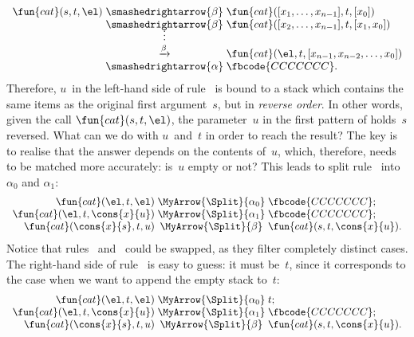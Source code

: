 \begin{equation*}
\begin{array}{r@{\;}c@{\;}l}
\fun{cat}(s,t,\el) & \smashedrightarrow{\beta} &
  \fun{cat}([x\sb{1},\ldots,x\sb{n-1}],t,[x\sb{0}])\\
              & \smashedrightarrow{\beta} &
  \fun{cat}([x\sb{2},\ldots,x\sb{n-1}],t,[x\sb{1},x\sb{0}])\\
              & \smash{\vdots}\\
              & \xrightarrow{\beta} & \fun{cat}(\el,t,[x\sb{n-1},x\sb{n-2},\ldots,x\sb{0}])\\
              & \smashedrightarrow{\alpha} & \fbcode{CCCCCCC}.
\end{array}
\end{equation*}
Therefore, \(u\)~in the left\hyp{}hand side of rule~\clause{\alpha} is
bound to a stack which contains the same items as the original first
argument~\(s\), but in \emph{reverse order}. In other words, given the
call \(\fun{cat}(s,t,\el)\), the parameter~\(u\) in the first pattern
of  holds~\(s\) reversed. What can we do with
\(u\)~and~\(t\) in order to reach the result?  The key is to realise
that the answer depends on the contents of~\(u\), which, therefore,
needs to be matched more accurately: is~\(u\) empty or not? This leads
to split rule~\clause{\alpha} into \(\alpha_0\) and \(\alpha_1\):
\newlength\Split\settowidth{}
\begin{equation*}
\begin{array}{r@{\;}c@{\;}l}
\fun{cat}(\el,t,\el) & \MyArrow{\Split}{\alpha\sb{0}} &
  \fbcode{CCCCCCC};\\
\fun{cat}(\el,t,\cons{x}{u}) & \MyArrow{\Split}{\alpha\sb{1}} &
  \fbcode{CCCCCCC};\\
\fun{cat}(\cons{x}{s},t,u) & \MyArrow{\Split}{\beta} &
 \fun{cat}(s,t,\cons{x}{u}).
\end{array}
\end{equation*}
Notice that rules ~and~ could be
swapped, as they filter completely distinct cases. The right\hyp{}hand
side of rule~ is easy to guess: it must be~\(t\),
since it corresponds to the case when we want to append the empty
stack to~\(t\):
\begin{equation*}
\begin{array}{r@{\;}c@{\;}l}
\fun{cat}(\el,t,\el) & \MyArrow{\Split}{\alpha\sb{0}} & t;\\
\fun{cat}(\el,t,\cons{x}{u}) & \MyArrow{\Split}{\alpha\sb{1}} & \fbcode{CCCCCCC};\\
\fun{cat}(\cons{x}{s},t,u) & \MyArrow{\Split}{\beta} &
  \fun{cat}(s,t,\cons{x}{u}).
\end{array}
\end{equation*}
